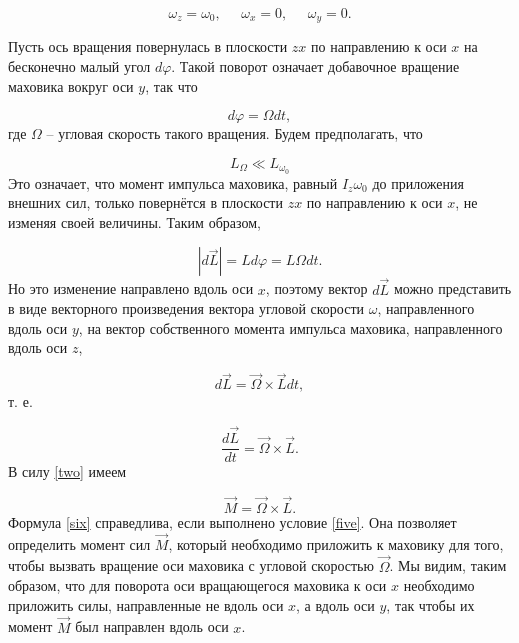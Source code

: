 \documentclass[a4paper, 12pt]{article}
\begin{document}
\begin{center}
\begin{equation}
\omega_z = \omega_0, \;\;\;\;\; \omega_x = 0, \;\;\;\;\; \omega_y = 0.
\end{equation}

\noindent Пусть ось вращения повернулась в плоскости $ zx $ по направлению к оси $ x $ на бесконечно малый угол $ d\varphi $. Такой поворот означает добавочное вращение маховика вокруг оси $ y $, так что

\begin{equation}
d\varphi=\Omega dt,
\end{equation}
где $ \Omega $ -- угловая скорость такого вращения. Будем предполагать, что

\begin{equation}
L_\Omega \ll L_{\omega_0}
\label{five}
\end{equation}
Это означает, что момент импульса маховика, равный $ I_z\omega_0 $ до приложения внешних сил, только повернётся в плоскости $ zx $ по направлению к оси $ x $, не изменяя своей величины. Таким образом, 

\begin{equation}
\left|d\vec{L}\right| = Ld\varphi = L\Omega dt.
\end{equation}
Но это изменение направлено вдоль оси $ x $, поэтому вектор $ d\vec{L} $ можно представить в виде векторного произведения вектора угловой скорости $ \omega $, направленного вдоль оси $ y $, на вектор собственного момента импульса маховика, направленного вдоль оси $ z $,

\begin{equation}
d\vec{L}=\vec{\Omega} \times \vec{L} dt,
\end{equation}
т. е.

\begin{equation}
\frac{d\vec{L}}{dt} = \vec{\Omega} \times \vec{L}.
\end{equation}
В силу \eqref{two} имеем

\begin{equation}
\vec{M} = \vec{\Omega} \times \vec{L}.
\label{six}
\end{equation}
Формула \eqref{six} справедлива, если выполнено условие \eqref{five}. Она позволяет определить момент сил $ \vec{M} $, который необходимо приложить к маховику для того, чтобы вызвать вращение оси маховика с угловой скоростью $ \vec{\Omega} $. Мы видим, таким образом, что для поворота оси вращающегося маховика к оси $ x $ необходимо приложить силы, направленные не вдоль оси $ x $, а вдоль оси $ y $, так чтобы их момент $ \vec{M} $ был направлен вдоль оси $ x $.


\end{center}
\end{document}
